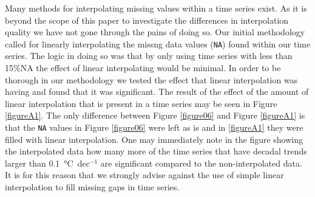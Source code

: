 \documentclass[]{ametsoc}
\begin{document}
%

\appendix
{}
Many methods for interpolating missing values within a time series exist. As it is beyond the scope of this paper to investigate the differences in interpolation quality we have not gone through the pains of doing so. Our initial methodology called for linearly interpolating the missng data values (\texttt{NA}) found within our time series. The logic in doing so was that by only using time series with less than 15\%NA the effect of linear interpolating would be minimal. In order to be thorough in our methodology we tested the effect that linear interpolation was having and found that it was significant. The result of the effect of the amount of linear interpolation that is present in a time series may be seen in Figure \ref{figureA1}. The only difference between Figure \ref{figure06} and Figure \ref{figureA1} is that the \texttt{NA} values in Figure \ref{figure06} were left as is and in \ref{figureA1} they were filled with linear interpolation. One may immediately note in the figure showing the interpolated data how many more of the time series that have decadal trends larger than \SI{0.1}{\degreeCelsius}~dec$^{-1}$ are significant compared to the non-interpolated data. It is for this reason that we strongly advise against the use of simple linear interpolation to fill missing gaps in time series.




\end{document}
